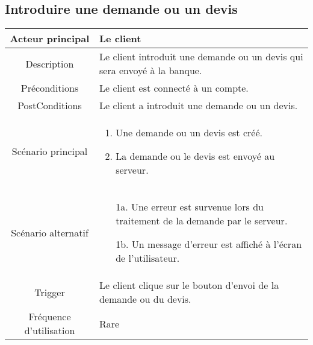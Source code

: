 \documentclass[]{article}
\begin{document}
\subsection{Introduire une demande ou un devis}
\begin{table}[h]
    \begin{tabular}{|c|p{10cm}|}
       \hline
       Acteur principal&Le client\\
       \hline
       Description&Le client introduit une demande ou un devis qui sera envoyé à la banque.\\
       \hline
       Préconditions&Le client est connecté à un compte.\\
       \hline
       PostConditions&Le client a introduit une demande ou un devis.\\
       \hline
       Scénario principal& 
             \begin{enumerate}
                \item Une demande ou un devis est créé.
                \item La demande ou le devis est envoyé au serveur.
             \end{enumerate}     \\
       \hline
       Scénario alternatif& 
       \begin{itemize}
        \item[1a.] Une erreur est survenue lors du traitement de la demande par le serveur.
        \item[1b.] Un message d'erreur est affiché à l'écran de l'utilisateur. 
    \end{itemize}
       \\
       \hline
       Trigger&Le client clique sur le bouton d'envoi de la demande ou du devis.\\
       \hline
       Fréquence d'utilisation&Rare\\
       \hline
    \end{tabular}
 \end{table}

\newpage

\end{document}

